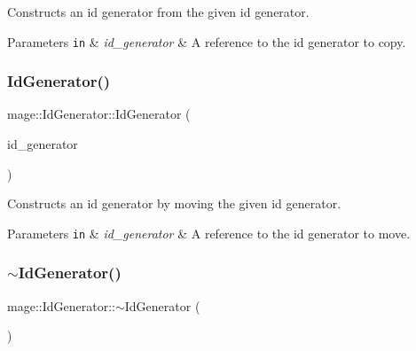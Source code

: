 Constructs an id generator from the given id generator.


\begin{DoxyParams}[1]{Parameters}
\mbox{\tt in}  & {\em id\+\_\+generator} & A reference to the id generator to copy. \\
\hline
\end{DoxyParams}
\hypertarget{classmage_1_1_id_generator_a0ee69053c6cdb9f79a5857e65ebd2b6a}{}\label{classmage_1_1_id_generator_a0ee69053c6cdb9f79a5857e65ebd2b6a} 
\subsubsection{\texorpdfstring{Id\+Generator()}{IdGenerator()}\hspace{0.1cm}{\footnotesize\ttfamily [3/3]}}
{\footnotesize\ttfamily mage\+::\+Id\+Generator\+::\+Id\+Generator (\begin{DoxyParamCaption}\item[{\hyperlink{classmage_1_1_id_generator}{Id\+Generator} \&\&}]{id\+\_\+generator }\end{DoxyParamCaption})\hspace{0.3cm}{\ttfamily [default]}}

Constructs an id generator by moving the given id generator.


\begin{DoxyParams}[1]{Parameters}
\mbox{\tt in}  & {\em id\+\_\+generator} & A reference to the id generator to move. \\
\hline
\end{DoxyParams}
\hypertarget{classmage_1_1_id_generator_a70161ab5b10294ebba1ace7a3b0f8d31}{}\label{classmage_1_1_id_generator_a70161ab5b10294ebba1ace7a3b0f8d31} 
\subsubsection{\texorpdfstring{$\sim$\+Id\+Generator()}{~IdGenerator()}}
{\footnotesize\ttfamily mage\+::\+Id\+Generator\+::$\sim$\+Id\+Generator (\begin{DoxyParamCaption}{ }\end{DoxyParamCaption})\hspace{0.3cm}{\ttfamily [default]}}

